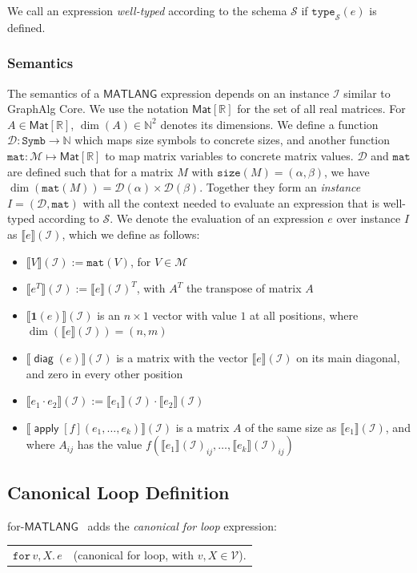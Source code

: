 \documentclass{article}
\newcommand\graphalg{\textsf{GraphAlg}}
\newcommand{\ML}{\mathsf{MATLANG}}
\newcommand{\rowdom}{\mathbf{1}}
\DeclareMathOperator{\diag}{\mathsf{diag}}
\DeclareMathOperator{\Apply}{\mathsf{apply}}
\newcommand{\ffor}[3]{\texttt{for}\, #1,#2 \texttt{.}\, #3}
\newcommand{\Mvar}{\mathcal{V}}
\newcommand{\I}{\mathcal{I}}
\newcommand{\Sch}{\mathcal{S}}
\newcommand{\ttypes}{\texttt{type}_{\Sch}}
\newcommand{\dom}{\mathcal{D}}
\newcommand{\sem}[2]{\llbracket #1 \rrbracket(#2)}
\newcommand{\Mnam}{\mathcal{M}}
\newcommand{\DD}{\texttt{Symb}}
\newcommand{\size}{\texttt{size}}
\newcommand{\mtr}[1]{\textsf{Mat}[#1]}
\newcommand{\RR}{\mathbb{R}}
\newcommand{\NN}{\mathbb{N}}
\newcommand{\conc}{\texttt{mat}}
\begin{document}
We call an expression \textit{well-typed} according to the schema $\Sch$ if $\ttypes(e)$ is defined.

\subsubsection*{Semantics}
The semantics of a $\ML$ expression depends on an instance $\I$ similar to \graphalg{} Core. 
We use the notation $\mtr{\RR}$ for the set of all real matrices.
For $A\in\mtr{\RR}$, $\dim(A)\in\NN^2$ denotes its dimensions.
We define a function $\dom : \DD \to \NN$ which maps size symbols to concrete sizes,
and another function $\conc : \Mnam \mapsto \mtr{\RR}$ to map matrix variables to concrete matrix values.
$\dom$ and $\conc$ are defined such that for a matrix $M$ with $\size(M) = (\alpha, \beta)$, we have $\dim(\conc(M)) = \dom(\alpha) \times \dom(\beta)$.
Together they form an \textit{instance} $I = (\dom, \conc)$ with all the context needed to evaluate an expression that is well-typed according to $\Sch$.
We denote the evaluation of an expression $e$ over instance $I$ as $\sem{e}{\I}$, which we define as follows:

\begin{itemize}
    \item $\sem{V}{\I} := \conc(V)$, for $V\in \Mnam$
    \item $\sem{e^T}{\I} := \sem{e}{\I}^T$, with $A^T$ the transpose of matrix $A$
    \item $\sem{\rowdom(e)}{\I}$ is an $n\times 1$ vector with value $1$ at all positions, where $\dim(\sem{e}{\I})=(n,m)$
    \item $\sem{\diag(e)}{\I}$ is a matrix with the vector $\sem{e}{\I}$ on its main diagonal, and zero in every other position
    \item $\sem{e_1\cdot e_2}{\I} := \sem{e_1}{\I} \cdot \sem{e_2}{\I}$
    \item $\sem{\Apply[f](e_1,\ldots ,e_k)}{\I}$ is a matrix $A$ of the same size as $\sem{e_1}{\I}$, and where $A_{ij}$ has the value $f(\sem{e_1}{\I}_{ij},\ldots ,\sem{e_k}{\I}_{ij})$
\end{itemize}

\subsection{Canonical Loop Definition}
for-$\ML$~\cite{geerts_expressive_2021} adds the \emph{canonical for loop} expression:

\medskip
\begin{tabular}{lc}
    $\ffor{v}{X}{e}$ & (canonical for loop, with $v, X \in \Mvar$).
\end{tabular}
\medskip
\end{document}

